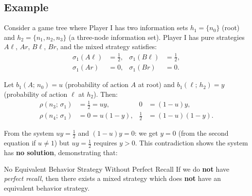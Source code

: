 \documentclass[12pt, a4paper]{article}
\begin{document}
\subsection{Example}

Consider a game tree where Player I has two information sets $h_1 = \{n_0\}$ (root) and $h_2 = \{n_1, n_2, n_3\}$ (a three-node information set). Player I has pure strategies $A\ell$, $Ar$, $B\ell$, $Br$, and the mixed strategy satisfies:
\begin{align*}
  \sigma_1(A\ell) &= \tfrac{1}{2}, & \sigma_1(B\ell) &= \tfrac{1}{2}, \\
  \sigma_1(Ar)    &= 0,            & \sigma_1(Br)    &= 0.
\end{align*}

Let $b_1(A;\, n_0) = u$ (probability of action $A$ at root) and $b_1(\ell;\, h_2) = y$ (probability of action $\ell$ at $h_2$). Then:
\begin{align*}
  \rho(n_3;\,\sigma_1) &= \tfrac{1}{2} = uy, & 0 &= (1-u)y, \\
  \rho(n_4;\,\sigma_1) &= 0 = u(1-y),        & \tfrac{1}{2} &= (1-u)(1-y).
\end{align*}

From the system $uy = \tfrac{1}{2}$ and $(1-u)y = 0$: we get $y = 0$ (from the second equation if $u \neq 1$) but $uy = \tfrac{1}{2}$ requires $y > 0$. This contradiction shows the system has \textbf{no solution}, demonstrating that:

\begin{warnbox}{No Equivalent Behavior Strategy Without Perfect Recall}
  If we do \textbf{not} have \emph{perfect recall}, then there exists a mixed strategy which does \textbf{not} have an equivalent behavior strategy.
\end{warnbox}
\end{document}
